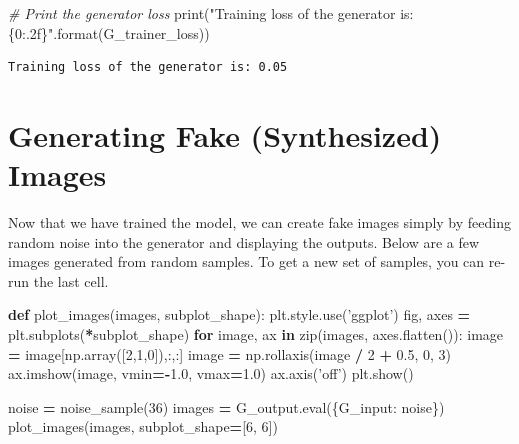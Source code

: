 \documentclass[]{book}
\newenvironment{Shaded}{\begin{snugshade}}{\end{snugshade}}
\newcommand{\KeywordTok}[1]{\textcolor[rgb]{0.13,0.29,0.53}{\textbf{#1}}}
\newcommand{\DecValTok}[1]{\textcolor[rgb]{0.00,0.00,0.81}{#1}}
\newcommand{\FloatTok}[1]{\textcolor[rgb]{0.00,0.00,0.81}{#1}}
\newcommand{\SpecialCharTok}[1]{\textcolor[rgb]{0.00,0.00,0.00}{#1}}
\newcommand{\StringTok}[1]{\textcolor[rgb]{0.31,0.60,0.02}{#1}}
\newcommand{\CommentTok}[1]{\textcolor[rgb]{0.56,0.35,0.01}{\textit{#1}}}
\newcommand{\ControlFlowTok}[1]{\textcolor[rgb]{0.13,0.29,0.53}{\textbf{#1}}}
\newcommand{\OperatorTok}[1]{\textcolor[rgb]{0.81,0.36,0.00}{\textbf{#1}}}
\newcommand{\BuiltInTok}[1]{#1}
\newcommand{\NormalTok}[1]{#1}
\theoremstyle{definition}
\theoremstyle{definition}
\theoremstyle{definition}
\theoremstyle{remark}
\begin{document}
\begin{Shaded}
\begin{Highlighting}[]
\CommentTok{# Print the generator loss }
\BuiltInTok{print}\NormalTok{(}\StringTok{"Training loss of the generator is: }\SpecialCharTok{\{0:.2f\}}\StringTok{"}\NormalTok{.}\BuiltInTok{format}\NormalTok{(G_trainer_loss))}
\end{Highlighting}
\end{Shaded}

\begin{verbatim}
Training loss of the generator is: 0.05
\end{verbatim}

\section{Generating Fake (Synthesized)
Images}\label{generating-fake-synthesized-images}

Now that we have trained the model, we can create fake images simply by
feeding random noise into the generator and displaying the outputs.
Below are a few images generated from random samples. To get a new set
of samples, you can re-run the last cell.

\begin{Shaded}
\begin{Highlighting}[]
\KeywordTok{def}\NormalTok{ plot_images(images, subplot_shape):}
\NormalTok{    plt.style.use(}\StringTok{'ggplot'}\NormalTok{)}
\NormalTok{    fig, axes }\OperatorTok{=}\NormalTok{ plt.subplots(}\OperatorTok{*}\NormalTok{subplot_shape)}
    \ControlFlowTok{for}\NormalTok{ image, ax }\KeywordTok{in} \BuiltInTok{zip}\NormalTok{(images, axes.flatten()):}
\NormalTok{        image }\OperatorTok{=}\NormalTok{ image[np.array([}\DecValTok{2}\NormalTok{,}\DecValTok{1}\NormalTok{,}\DecValTok{0}\NormalTok{]),:,:]}
\NormalTok{        image }\OperatorTok{=}\NormalTok{ np.rollaxis(image }\OperatorTok{/} \DecValTok{2} \OperatorTok{+} \FloatTok{0.5}\NormalTok{, }\DecValTok{0}\NormalTok{, }\DecValTok{3}\NormalTok{)}
\NormalTok{        ax.imshow(image, vmin}\OperatorTok{=-}\FloatTok{1.0}\NormalTok{, vmax}\OperatorTok{=}\FloatTok{1.0}\NormalTok{)}
\NormalTok{        ax.axis(}\StringTok{'off'}\NormalTok{)}
\NormalTok{    plt.show()}
    
\NormalTok{noise }\OperatorTok{=}\NormalTok{ noise_sample(}\DecValTok{36}\NormalTok{)}
\NormalTok{images }\OperatorTok{=}\NormalTok{ G_output.}\BuiltInTok{eval}\NormalTok{(\{G_input: noise\})}
\NormalTok{plot_images(images, subplot_shape}\OperatorTok{=}\NormalTok{[}\DecValTok{6}\NormalTok{, }\DecValTok{6}\NormalTok{])}
\end{Highlighting}
\end{Shaded}
\end{document}
